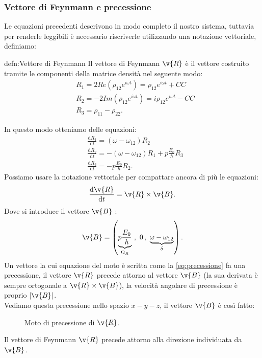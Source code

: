 \subsubsection{Vettore di Feynmann e precessione}%
Le equazioni precedenti descrivono in modo completo il nostro sistema, tuttavia per renderle leggibili è necessario riscriverle utilizzando una notazione vettoriale, definiamo:
\begin{defn}{defn:Vettore di Feynmann}
    Il vettore di Feynmann $\v{R}$ è il vettore costruito tramite le componenti della matrice densità nel seguente modo:
\[\begin{aligned}
    &R_1=2Re\left(\rho_{12}e^{i\omega t}\right)=\rho_{12}e^{i\omega t}+ CC\\
    &R_2= -2 Im\left(\rho_{12}e^{i\omega t}\right)=i\rho_{12}e^{i\omega t}- CC\\
    &R_3 = \rho_{11}-\rho_{22}
.\end{aligned}\]
\end{defn}
In questo modo otteniamo delle equazioni:
\[\begin{aligned}
    &\frac{\text{d} R_1}{\text{d} t} = \left(\omega-\omega_{12}\right)R_2\\
    & \frac{\text{d} R_2}{\text{d} t} = -\left(\omega-\omega_{12}\right)R_1+
    p \frac{E_0}{\hbar }R_3\\
    &\frac{\text{d} R_3}{\text{d} t} =-p \frac{E_0}{\hbar }R_2
.\end{aligned}\]
Possiamo usare la notazione vettoriale per compattare ancora di più le equazioni:
\[
    \frac{\text{d} \v{R}}{\text{d} t} = \v{R} \times \v{B} 
    \label{eq:precessione}
.\] 
Dove si introduce il vettore $\v{B}$ :
\[
    \v{B} = \left(\underbrace{p \frac{E_0}{\hbar}}_{\Omega_R} \ , \  0 \,
    ,\ \underbrace{\omega-\omega_{12}}_{\delta}\right)
.\] 
Un vettore la cui equazione del moto è scritta come la \ref{eq:precessione} fa una precessione, il vettore $\v{R}$ precede attorno al vettore $\v{B}$ (la sua derivata è sempre ortogonale a $\v{R}\times \v{B}$), la velocità angolare di precessione è proprio $\left|\v{B}\right|$. \\
Vediamo questa precessione nello spazio $x-y-z$, il vettore $\v{B}$ è così fatto:
\begin{figure}[H]
    \centering
    \caption{Moto di precessione di $\v{R}$.}
    \label{fig:vettore-b-della-precessione}
\end{figure}
\noindent
Il vettore di Feynmann $\v{R}$ precede attorno alla direzione individuata da $\v{B}$.
